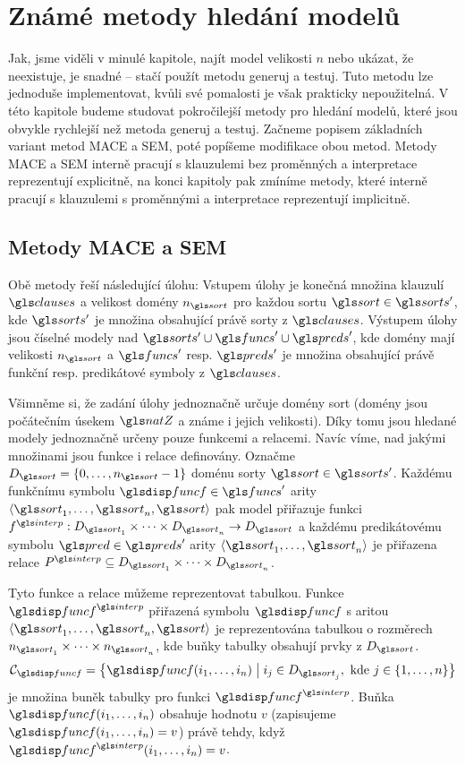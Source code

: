 \chapter{Známé metody hledání modelů}

Jak, jsme viděli v minulé kapitole, najít model
velikosti $n$ nebo ukázat, že neexistuje, je snadné --
stačí použít metodu generuj a testuj.
Tuto metodu lze jednoduše implementovat,
kvůli své pomalosti je však prakticky nepoužitelná.
V této kapitole budeme studovat pokročilejší metody
pro hledání modelů, které jsou obvykle rychlejší
než metoda generuj a testuj.
Začneme popisem základních variant metod MACE a SEM,
poté popíšeme modifikace obou metod.
Metody MACE a SEM interně pracují s klauzulemi bez proměnných
a interpretace reprezentují explicitně,
na konci kapitoly pak zmíníme metody, které interně
pracují s klauzulemi s proměnnými a interpretace reprezentují
implicitně.

\section{Metody MACE a SEM}

Obě metody řeší následující úlohu:
Vstupem úlohy je konečná množina
klauzulí $\clauses$ a velikost domény $n_\sort$
pro každou sortu $\sort \in \sorts'$, kde $\sorts'$ je množina
obsahující právě sorty z $\clauses$. Výstupem úlohy jsou číselné modely
nad $\sorts' \cup \funcs' \cup \preds'$, kde domény mají velikosti
$n_\sort$ a $\funcs'$ resp. $\preds'$ je množina obsahující právě funkční
resp. predikátové symboly z $\clauses$.

Všimněme si, že zadání úlohy jednoznačně určuje domény sort
(domény jsou počátečním úsekem $\natZ$ a známe i jejich velikosti).
Díky tomu jsou hledané modely jednoznačně určeny pouze funkcemi a relacemi.
Navíc víme, nad jakými množinami jsou funkce i relace definovány.
Označme $D_\sort = \{ 0 \comdots n_\sort - 1 \}$ doménu
sorty $\sort \in \sorts'$.
Každému funkčnímu symbolu $\func \in \funcs'$ arity
$\langle \sort_1 \comdots \sort_n, \sort \rangle$ pak model přiřazuje funkci
$f^\interp : D_{\sort_1} \timdots D_{\sort_n} \to D_\sort$
a každému predikátovému symbolu $\pred \in \preds'$ arity
$\langle \sort_1 \comdots \sort_n \rangle$
je přiřazena relace $P^\interp \subseteq D_{\sort_1} \timdots D_{\sort_n}$.

\newcommand\cells{\ensuremath{\mathcal{C}}}

Tyto funkce a relace můžeme reprezentovat tabulkou.
Funkce $\func^\interp$ přiřazená symbolu $\func$
s aritou $\langle \sort_1 \comdots \sort_n, \sort \rangle$
je reprezentována tabulkou o rozměrech $n_{\sort_1} \timdots n_{\sort_n}$,
kde buňky tabulky obsahují prvky z $D_\sort$.
\[
\cells_\func = \bigl\{ \func(i_1 \comdots i_n) \bigm| i_j \in D_{\sort_j},
  \text{ kde } j \in \{ 1 \comdots n  \}  \bigr\}
\]
je množina buněk tabulky pro funkci $\func^\interp$.
Buňka $\func(i_1 \comdots i_n)$ obsahuje hodnotu $v$ (zapisujeme
$\func(i_1 \comdots i_n) = v$) právě tehdy,
když $\func^\interp(i_1 \comdots i_n) = v$.

